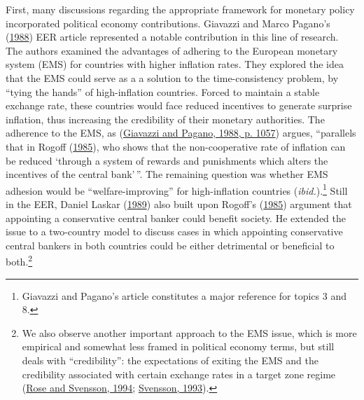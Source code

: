 \documentclass[
  12pt,
  onecolumn]{article}
\begin{document}
First, many discussions regarding the appropriate framework for monetary
policy incorporated political economy contributions. Giavazzi and Marco
Pagano's (\protect\hyperlink{ref-giavazzi1988}{1988}) EER article
represented a notable contribution in this line of research. The authors
examined the advantages of adhering to the European monetary system
(EMS) for countries with higher inflation rates. They explored the idea
that the EMS could serve as a a solution to the time-consistency
problem, by ``tying the hands'' of high-inflation countries. Forced to
maintain a stable exchange rate, these countries would face reduced
incentives to generate surprise inflation, thus increasing the
credibility of their monetary authorities. The adherence to the EMS, as
(\protect\hyperlink{ref-giavazzi1988}{Giavazzi and Pagano, 1988, p.
1057}) argues, ``parallels that in Rogoff
(\protect\hyperlink{ref-rogoff1985b}{1985}), who shows that the
non-cooperative rate of inflation can be reduced `through a system of
rewards and punishments which alters the incentives of the central
bank'\,''. The remaining question was whether EMS adhesion would be
``welfare-improving'' for high-inflation countries
(\emph{ibid.}).\footnote{Giavazzi and Pagano's article constitutes a
  major reference for topics 3 and 8.} Still in the EER, Daniel Laskar
(\protect\hyperlink{ref-laskar1989}{1989}) also built upon Rogoff's
(\protect\hyperlink{ref-rogoff1985b}{1985}) argument that appointing a
conservative central banker could benefit society. He extended the issue
to a two-country model to discuss cases in which appointing conservative
central bankers in both countries could be either detrimental or
beneficial to both.\footnote{We also observe another important approach
  to the EMS issue, which is more empirical and somewhat less framed in
  political economy terms, but still deals with ``credibility'': the
  expectations of exiting the EMS and the credibility associated with
  certain exchange rates in a target zone regime
  (\protect\hyperlink{ref-rose1994}{Rose and Svensson, 1994};
  \protect\hyperlink{ref-svensson1993a}{Svensson, 1993}).}
\end{document}
